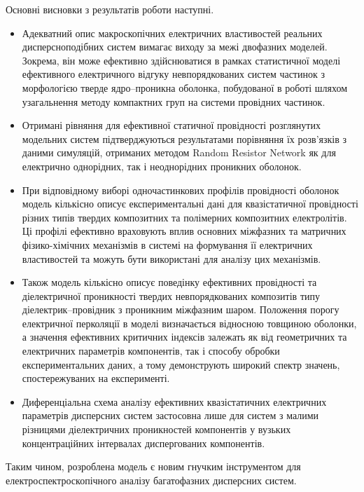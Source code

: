 

Основні висновки з результатів роботи наступні.

\begin{itemize}
	\item Адекватний опис макроскопічних електричних властивостей реальних дисперсноподібних систем вимагає виходу за межі двофазних моделей. Зокрема, він може ефективно здійснюватися в рамках статистичної моделі ефективного електричного відгуку невпорядкованих систем частинок з морфологією тверде ядро--проникна оболонка, побудованої в роботі шляхом узагальнення методу компактних груп на системи провідних частинок.
	
	\item Отримані рівняння для ефективної статичної провідності розглянутих модельних систем підтверджуються результатами порівняння їх розв'язків з даними симуляцій, отриманих методом Random Resistor Network як для електрично однорідних, так і неоднорідних проникних оболонок.  
	
	\item При відповідному виборі одночастинкових профілів провідності оболонок модель кількісно описує експериментальні дані для квазістатичної провідності різних типів твердих композитних та полімерних композитних електролітів. Ці профілі ефективно враховують вплив основних міжфазних та матричних фізико-хімічних механізмів в системі на формування її електричних властивостей та можуть бути використані для аналізу цих механізмів.
	
	\item Також модель кількісно описує поведінку ефективних провідності та діелектричної проникності твердих невпорядкованих композитів типу діелектрик--провідник з проникним міжфазним шаром. Положення порогу електричної перколяції в моделі визначається відносною товщиною оболонки, а значення ефективних критичних індексів  залежать як від геометричних та електричних параметрів компонентів, так і способу обробки експериментальних даних, а тому демонструють широкий спектр значень, спостережуваних на експерименті.
	
	\item Диференціальна схема аналізу ефективних квазістатичних електричних параметрів дисперсних систем застосовна лише для систем з малими різницями діелектричних проникностей компонентів у вузьких концентраційних інтервалах диспергованих компонентів.
\end{itemize}

Таким чином, розроблена модель є новим гнучким інструментом для  електроспектроскопічного аналізу багатофазних дисперсних систем.